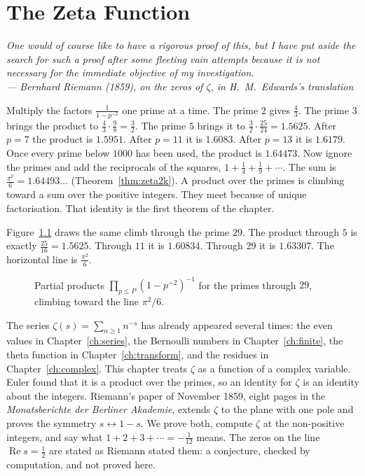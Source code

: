 \chapter{The Zeta Function}\label{ch:zeta}

\begin{center}\itshape
One would of course like to have a rigorous proof of this, but I have put aside the search for such a proof after some
fleeting vain attempts because it is not necessary for the immediate objective of my investigation.\\
\upshape --- Bernhard Riemann (1859), on the zeros of $\zeta$, in H.~M.~Edwards's translation
\end{center}

Multiply the factors $\frac1{1-p^{-2}}$ one prime at a time. The prime $2$ gives $\frac43$. The prime $3$ brings the product to $\frac43\cdot\frac98=\frac32$. The prime $5$ brings it to $\frac32\cdot\frac{25}{24}=1.5625$. After $p=7$ the product is $1.5951$. After $p=11$ it is $1.6083$. After $p=13$ it is $1.6179$. Once every prime below $1000$ has been used, the product is $1.64473$. Now ignore the primes and add the reciprocals of the squares, $1+\frac14+\frac19+\cdots$. The sum is $\frac{\pi^2}6=1.64493\ldots$ (Theorem~\ref{thm:zeta2k}). A product over the primes is climbing toward a sum over the positive integers. They meet because of unique factorisation. That identity is the first theorem of the chapter.

Figure~\ref{fig:rw10-euler} draws the same climb through the prime $29$. The product through $5$ is exactly $\frac{25}{16}=1.5625$. Through $11$ it is $1.60834$. Through $29$ it is $1.63307$. The horizontal line is $\frac{\pi^2}6$.

\begin{figure}[ht]
\centering
{}
\caption{Partial products $\prod_{p\le P}(1-p^{-2})^{-1}$ for the primes through $29$, climbing toward the line $\pi^2/6$.}
\label{fig:rw10-euler}
\end{figure}

The series $\zeta(s)=\sum_{n\ge1}n^{-s}$ has already appeared several times: the even values in Chapter~\ref{ch:series}, the Bernoulli numbers in Chapter~\ref{ch:finite}, the theta function in Chapter~\ref{ch:transform}, and the residues in Chapter~\ref{ch:complex}. This chapter treats $\zeta$ as a function of a complex variable. Euler found that it is a product over the primes, so an identity for $\zeta$ is an identity about the integers. Riemann's paper of November 1859, eight pages in the \emph{Monatsberichte der Berliner Akademie}, extends $\zeta$ to the plane with one pole and proves the symmetry $s\leftrightarrow 1-s$. We prove both, compute $\zeta$ at the non-positive integers, and say what $1+2+3+\cdots=-\frac1{12}$ means. The zeros on the line $\operatorname{Re}s=\frac12$ are stated as Riemann stated them: a conjecture, checked by computation, and not proved here.

